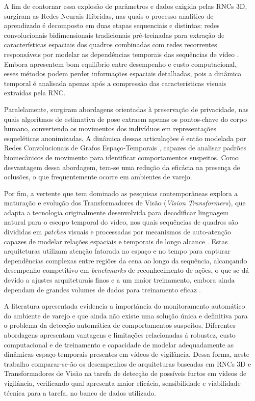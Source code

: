 \documentclass[12pt, %
openright, 
oneside, %
a4paper,    %
brazil]{facom-ufu-abntex2}
\begin{document}
A fim de contornar essa explosão de parâmetros e dados exigida pelas RNCs 3D, surgiram as Redes Neurais Híbridas, nas quais o processo analítico de aprendizado é decomposto em duas etapas sequenciais e distintas: redes convolucionais bidimensionais tradicionais pré-treinadas para extração de características espaciais dos quadros combinadas com redes recorrentes responsáveis por modelar as dependências temporais das sequências de vídeo \cite{muneer}. Embora apresentem bom equilíbrio entre desempenho e custo computacional, esses métodos podem perder informações espaciais detalhadas, pois a dinâmica temporal é analisada apenas após a compressão das características visuais extraídas pela RNC.

Paralelamente, surgiram abordagens orientadas à preservação de privacidade, nas quais algoritmos de estimativa de pose extraem apenas os pontos-chave do corpo humano, convertendo os movimentos dos indivíduos em representações esqueléticas anonimizadas. A dinâmica dessas articulações é então modelada por Redes Convolucionais de Grafos Espaço-Temporais \cite{poselift}, capazes de analisar padrões biomecânicos de movimento para identificar comportamentos suspeitos. Como desvantagem dessa abordagem, tem-se uma redução da eficácia na presença de oclusões, o que frequentemente ocorre em ambientes de varejo.

Por fim, a vertente que tem dominado as pesquisas contemporâneas explora a maturação e evolução dos Transformadores de Visão (\textit{Vision Transformers}), que adapta a tecnologia originalmente desenvolvida para decodificar linguagem natural para o escopo temporal do vídeo, nos quais sequências de quadros são divididas em \textit{patches} visuais e processadas por mecanismos de auto-atenção capazes de modelar relações espaciais e temporais de longo alcance \cite{timesformer}. Estas arquiteturas utilizam atenção fatorada no espaço e no tempo para capturar dependências complexas entre regiões da cena ao longo da sequência, alcançando desempenho competitivo em \textit{benchmarks} de reconhecimento de ações, o que se dá devido a ajustes arquiteturais finos e a um maior treinamento, embora ainda dependam de grandes volumes de dados para treinamento eficaz  \cite{vitmetrics}.

A literatura apresentada evidencia a importância do monitoramento automático do ambiente de varejo e que ainda não existe uma solução única e definitiva para o problema da detecção automática de comportamentos suspeitos. Diferentes abordagens apresentam vantagens e limitações relacionadas à robustez, custo computacional e de treinamento e capacidade de modelar adequadamente as dinâmicas espaço-temporais presentes em vídeos de vigilância. Dessa forma, neste trabalho comparar-se-ão os desempenhos de arquiteturas baseadas em RNCs 3D e Transformadores de Visão na tarefa de detecção de possíveis furtos em vídeos de vigilância, verificando qual apresenta maior eficácia, sensibilidade e viabilidade técnica para a tarefa, no banco de dados utilizado.
\end{document}
